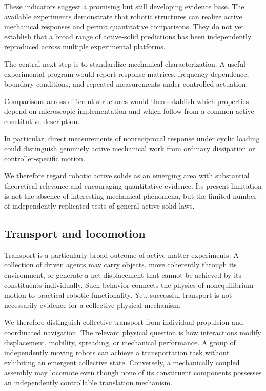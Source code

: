 These indicators suggest
a promising but still
developing evidence base.
The available experiments
demonstrate that robotic
structures can realize
active mechanical
responses and permit
quantitative comparisons.
They do not yet establish
that a broad range
of active-solid
predictions has been
independently reproduced
across multiple
experimental platforms.

The central next step
is to standardize
mechanical characterization.
A useful experimental
program would report
response matrices,
frequency dependence,
boundary conditions,
and repeated measurements
under controlled
actuation.

Comparisons across
different structures
would then establish
which properties
depend on microscopic
implementation and
which follow from
a common active
constitutive description.

In particular, direct
measurements of
nonreciprocal response
under cyclic loading
could distinguish
genuinely active
mechanical work
from ordinary
dissipation or
controller-specific
motion.

We therefore regard
robotic active solids
as an emerging area
with substantial
theoretical relevance
and encouraging
quantitative evidence.
Its present limitation
is not the absence
of interesting
mechanical phenomena,
but the limited
number of independently
replicated tests
of general
active-solid laws.

\subsection{Transport and locomotion}
\label{sec:phenomena-transport}

Transport is a particularly broad outcome of active-matter
experiments. A collection of driven agents may carry objects,
move coherently through its environment, or generate a net
displacement that cannot be achieved by its constituents
individually. Such behavior connects the physics of
nonequilibrium motion to practical robotic functionality.
Yet, successful transport is not necessarily evidence
for a collective physical mechanism.

We therefore distinguish collective transport from
individual propulsion and coordinated navigation.
The relevant physical question is how interactions
modify displacement, mobility, spreading, or
mechanical performance. A group of independently
moving robots can achieve a transportation task
without exhibiting an emergent collective state.
Conversely, a mechanically coupled assembly may
locomote even though none of its constituent
components possesses an independently controllable
translation mechanism.


